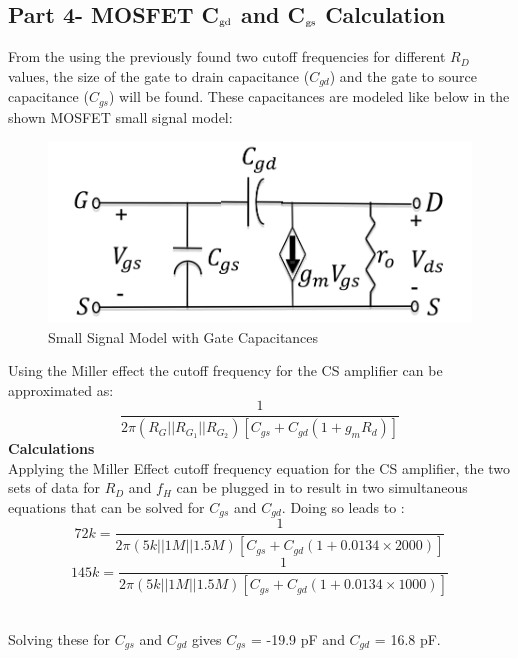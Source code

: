 \documentclass[12pt]{article}
\begin{document}
\subsection*{Part 4- MOSFET C$_\textnormal{gd}$ and C$_\textnormal{gs}$ Calculation}
From the using the previously found two cutoff frequencies for different $R_D$ values, the size of the gate to drain capacitance ($C_{gd}$) and the gate to source capacitance ($C_{gs}$) will be found. These capacitances are modeled like below in the shown MOSFET small signal model:\\\par
\FloatBarrier
\begin{figure}[h!]
\begin{center}
 \includegraphics[scale=0.23]{./plots/3.png}
\end{center}
\caption{Small Signal Model with Gate Capacitances}
\end{figure}
\FloatBarrier
Using the Miller effect the cutoff frequency for the CS amplifier can be approximated as:
\begin{equation}
\frac{1}{2\pi(R_G || R_{G_1} || R_{G_2})[C_{gs} + C_{gd}(1 + g_m R_d)] }
\end{equation}
\textbf{Calculations}\\
Applying the Miller Effect cutoff frequency equation for the CS amplifier, the two sets of data for $R_D$ and $f_H$ can be plugged in to result in two simultaneous equations that can be solved for $C_{gs}$ and $C_{gd}$. Doing so leads to :
\begin{equation}
72k = \frac{1}{2\pi(5k || 1M || 1.5M)[C_{gs} + C_{gd}(1 + 0.0134 \times 2000)] }
\end{equation}
\begin{equation}
145k = \frac{1}{2\pi(5k || 1M || 1.5M)[C_{gs} + C_{gd}(1 + 0.0134 \times 1000)] }
\end{equation}
\\\par
Solving these for $C_{gs}$ and $C_{gd}$ gives $C_{gs}$ = -19.9 pF and $C_{gd}$ = 16.8 pF.\\\par
\end{document}
